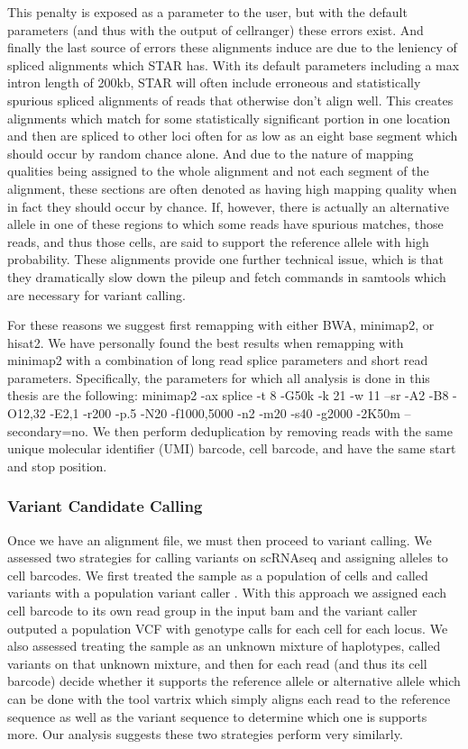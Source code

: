 This penalty is exposed as a parameter to the user, but with the default parameters (and thus with the output of cellranger) these errors exist. 
And finally the last source of errors these alignments induce are due to the leniency of spliced alignments which STAR has. With its default parameters including 
a max intron length of 200kb, STAR will often include erroneous and statistically spurious spliced alignments of reads that otherwise don't align well. This creates alignments 
which match for some statistically significant portion in one location and then are spliced to other loci often for as low as an eight base segment which should occur by 
random chance alone. And due to the nature of mapping qualities being assigned to the whole alignment and not each segment of the alignment, these sections are often denoted as 
having high mapping quality when in fact they should occur by chance. If, however, there is actually an alternative allele in one of these regions to which some reads have 
spurious matches, those reads, and thus those cells, are said to support the reference allele with high probability. These alignments provide one further technical 
issue, which is that they dramatically slow down the pileup and fetch commands in samtools \cite{samtools} which are necessary for variant calling. 

For these reasons we suggest first remapping with either BWA, minimap2, or hisat2. We have personally found the best results when remapping with minimap2 with a combination 
of long read splice parameters and short read parameters. Specifically, the parameters for which all analysis is done in this thesis are the following: 
minimap2 -ax splice -t 8 -G50k -k 21 -w 11 --sr -A2 -B8 -O12,32 -E2,1 -r200 -p.5 -N20 -f1000,5000 -n2 -m20 -s40 -g2000 -2K50m --secondary=no. We then perform 
deduplication by removing reads with the same unique molecular identifier (UMI) barcode, cell barcode, and have the same start and stop position.


\subsubsection{Variant Candidate Calling}
Once we have an alignment file, we must then proceed to variant calling. We assessed two strategies for calling variants on scRNAseq and assigning alleles to cell barcodes. We first treated 
the sample as a population of cells and called variants with a population variant caller \cite{freebayes} \cite{gatk} \cite{samtools}. With this approach we assigned each cell barcode to its own read group in the input bam and the variant caller outputed a population VCF with genotype calls for each cell for each locus.
We also assessed treating the sample as an unknown mixture of haplotypes, called variants on that unknown mixture, and then for each read (and thus its cell barcode) decide whether it supports the reference allele or alternative allele which can be done with the tool vartrix\cite{vartrix} which simply aligns each read to the reference sequence as well as the variant sequence to determine which one is supports more. Our analysis suggests these two strategies perform very similarly. 

